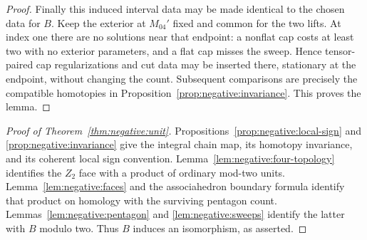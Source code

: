 \begin{proof}
Finally this induced interval data may be made identical to the
chosen data for $B$.  Keep the exterior at $M_{04}'$ fixed and common
for the two lifts.  At index one there are no solutions near that
endpoint: a nonflat cap costs at least two with no exterior
parameters, and a flat cap misses the sweep.  Hence tensor-paired
cap regularizations and cut data may be inserted there, stationary
at the endpoint, without changing the count.  Subsequent comparisons
are precisely the compatible homotopies in
Proposition~\ref{prop:negative:invariance}.  This proves the lemma.
\end{proof}

\begin{proof}[Proof of Theorem~\ref{thm:negative:unit}]
Propositions~\ref{prop:negative:local-sign} and
\ref{prop:negative:invariance} give the integral chain map, its
homotopy invariance, and its coherent local sign convention.
Lemma~\ref{lem:negative:four-topology} identifies the $Z_2$ face
with a product of ordinary mod-two units.
Lemma~\ref{lem:negative:faces} and the associahedron boundary formula
identify that product on homology with the surviving pentagon count.
Lemmas~\ref{lem:negative:pentagon} and \ref{lem:negative:sweeps}
identify the latter with $B$ modulo two.  Thus $B$ induces an
isomorphism, as asserted.
\end{proof}
